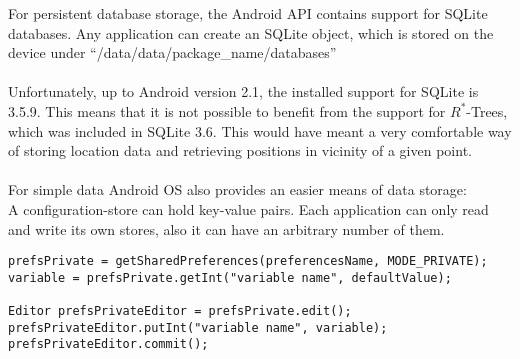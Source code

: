 For persistent database storage, the Android API contains
support for SQLite databases. Any application can create
an SQLite object, which is stored on the device under
``/data/data/package\_name/databases''\\\\
Unfortunately, up to Android version 2.1, the installed
support for SQLite is 3.5.9. This means that it is not
possible to benefit from the support for $R^*$-Trees,
which was included in SQLite 3.6. This would have meant
a very comfortable way of storing location data and
retrieving positions in vicinity of a given point.\\\\
For simple data Android OS also provides an easier means of data storage:\\
A configuration-store can hold key-value pairs. Each application can only read and 
write its own stores, also it can have an arbitrary number of them.
\begin{verbatim}
prefsPrivate = getSharedPreferences(preferencesName, MODE_PRIVATE);
variable = prefsPrivate.getInt("variable name", defaultValue);

Editor prefsPrivateEditor = prefsPrivate.edit();
prefsPrivateEditor.putInt("variable name", variable);
prefsPrivateEditor.commit();
\end{verbatim}
